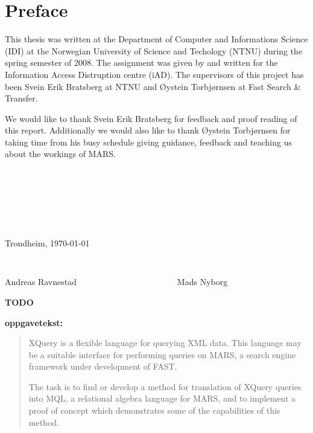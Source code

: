 \chapter*{Preface}

This thesis was written at the Department of Computer and Informations Science
(IDI) at the Norwegian University of Science and Techology (NTNU) during the
spring semester of 2008. The assignment was given by and written for the
Information Access Distruption centre (iAD). The supervisors of this project
has been Svein Erik Bratsberg at NTNU and \O ystein Torbj\o rnsen at Fast
Search \& Transfer.

We would like to thank Svein Erik Bratsberg for feedback and proof reading of
this report. Additionally we would also like to thank \O ystein Torbj\o rnsen
for taking time from his busy schedule giving guidance, feedback and teaching
us about the workings of MARS.

\begin{verbatim}







\end{verbatim}
\begin{center}

Trondheim, \today

\begin{verbatim}


\end{verbatim}
Andreas Ravnestad \verb!                      ! Mads Nyborg
\end{center}

\textbf{\LARGE TODO} 

\textbf{\Large oppgavetekst:} 

\begin{quote}
XQuery is a flexible language for querying XML data. This language may be a
suitable interface for performing queries on MARS, a search engine
framework under development of FAST.

The task is to find or develop a method for translation of XQuery queries into
MQL, a relational algebra language for MARS, and to implement a proof of concept which
demonstrates some of the capabilities of this method.

\end{quote}

